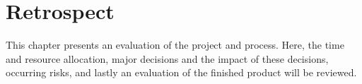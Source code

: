 \chapter{Retrospect}
This chapter presents an evaluation of the project and process. Here, the time and resource allocation, major decisions and the impact of these decisions, occurring risks, and lastly an evaluation of the finished product will be reviewed.





